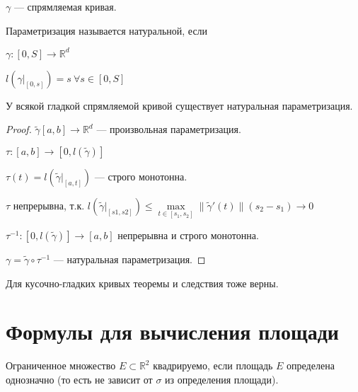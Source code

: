     \begin{Def}

        $\gamma$ --- спрямляемая кривая.

        Параметризация называется натуральной, если 
    
        $\gamma \colon [0, S] \rightarrow \mathbb{R}^d$

        $l(\gamma|_{[0, s]}) = s \: \forall s \in [0, S]$

    \end{Def}

    \begin{theorem}

        У всякой гладкой спрямляемой кривой существует натуральная параметризация.

    \end{theorem}

    \begin{proof}

        $\widetilde{\gamma}[a, b] \rightarrow \mathbb{R}^d$ --- произвольная параметризация.

        $\tau \colon [a, b] \rightarrow [0, l(\widetilde{\gamma})]$

        $\tau(t) = l(\widetilde{\gamma}|_{[a, t]})$ --- строго монотонна.

        $\tau$ непрерывна, т.к. $l(\widetilde{\gamma}|_{[s1, s2]}) \le \max\limits_{t \in [s_1,s_2]}\|\widetilde{\gamma}'(t)\|(s_2 - s_1) \rightarrow 0$

        $\tau^{-1} \colon [0, l(\widetilde{\gamma})] \rightarrow [a, b]$ непрерывна и строго монотонна.

        $\gamma = \widetilde{\gamma} \circ \tau^{-1}$ --- натуральная параметризация.

    \end{proof}

    \begin{Rem}

        Для кусочно-гладких кривых теоремы и следствия тоже верны.

    \end{Rem}

\section {Формулы для вычисления площади}

    \begin{Def}

        Ограниченное множество $E \subset \mathbb{R}^2$ квадрируемо, если площадь $E$ определена однозначно (то есть не зависит от $\sigma$ из определения площади).

    \end{Def}

